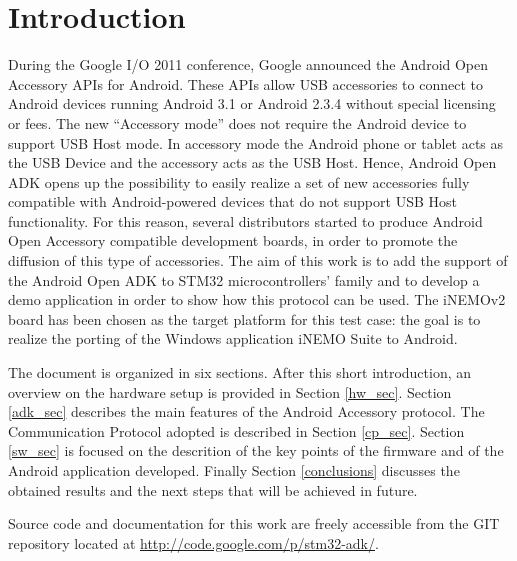 \section{Introduction}
\label{intro}

During the Google I/O 2011 conference, Google announced the Android Open Accessory APIs for Android. These APIs allow USB accessories to connect to Android devices running Android 3.1 or Android 2.3.4 without special licensing or fees. The new ``Accessory mode'' does not require the Android device to support USB Host mode. In accessory mode the Android phone or tablet acts as the USB Device and the accessory acts as the USB Host. Hence, Android Open ADK opens up the possibility to easily realize a set of new accessories fully compatible with Android-powered devices that do not support USB Host functionality. For this reason, several distributors started to produce Android Open Accessory compatible development boards, in order to promote the diffusion of this type of accessories. The aim of this work is to add the support of the Android Open ADK to STM32 microcontrollers' family and to develop a demo application in order to show how this protocol can be used. The iNEMOv2 board has been chosen as the target platform for this test case: the goal is to realize the porting of the Windows application iNEMO Suite to Android.

The document is organized in six sections. After this short introduction, an overview on the hardware setup is provided in Section \ref{hw_sec}. Section \ref{adk_sec} describes the main features of the Android Accessory protocol. The Communication Protocol adopted is described in Section \ref{cp_sec}. Section \ref{sw_sec} is focused on the descrition of the key points of the firmware and of the Android application developed. Finally Section \ref{conclusions} discusses the obtained results and the next steps that will be achieved in future.

Source code and documentation for this work are freely accessible from the GIT repository located at \url{http://code.google.com/p/stm32-adk/}. 
